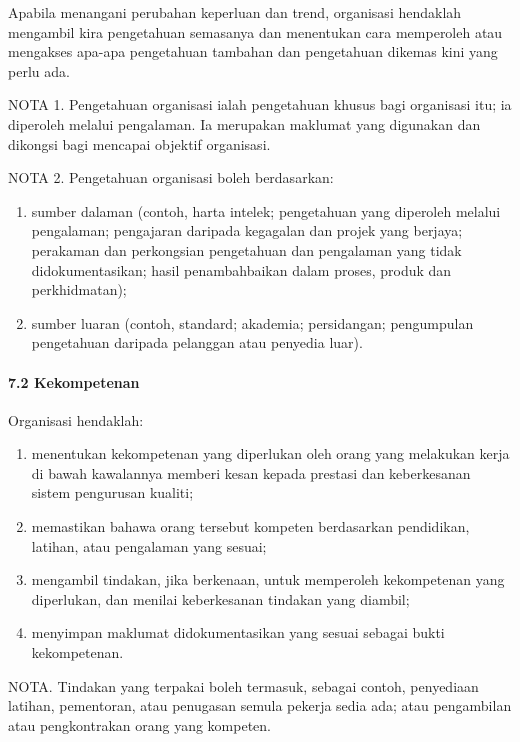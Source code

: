 \documentclass[
]{article}
\begin{document}
Apabila menangani perubahan keperluan dan trend, organisasi hendaklah
mengambil kira pengetahuan semasanya dan menentukan cara memperoleh atau
mengakses apa-apa pengetahuan tambahan dan pengetahuan dikemas kini yang
perlu ada.

NOTA 1. Pengetahuan organisasi ialah pengetahuan khusus bagi organisasi
itu; ia diperoleh melalui pengalaman. Ia merupakan maklumat yang
digunakan dan dikongsi bagi mencapai objektif organisasi.

NOTA 2. Pengetahuan organisasi boleh berdasarkan:

\begin{enumerate}
\def\labelenumi{\alph{enumi})}
\item
  sumber dalaman (contoh, harta intelek; pengetahuan yang diperoleh
  melalui pengalaman; pengajaran daripada kegagalan dan projek yang
  berjaya; perakaman dan perkongsian pengetahuan dan pengalaman yang
  tidak didokumentasikan; hasil penambahbaikan dalam proses, produk dan
  perkhidmatan);
\item
  sumber luaran (contoh, standard; akademia; persidangan; pengumpulan
  pengetahuan daripada pelanggan atau penyedia luar).
\end{enumerate}

\hypertarget{kekompetenan}{%
\paragraph{7.2 Kekompetenan}\label{kekompetenan}}

Organisasi hendaklah:

\begin{enumerate}
\def\labelenumi{\alph{enumi})}
\item
  menentukan kekompetenan yang diperlukan oleh orang yang melakukan
  kerja di bawah kawalannya memberi kesan kepada prestasi dan
  keberkesanan sistem pengurusan kualiti;
\item
  memastikan bahawa orang tersebut kompeten berdasarkan pendidikan,
  latihan, atau pengalaman yang sesuai;
\item
  mengambil tindakan, jika berkenaan, untuk memperoleh kekompetenan yang
  diperlukan, dan menilai keberkesanan tindakan yang diambil;
\item
  menyimpan maklumat didokumentasikan yang sesuai sebagai bukti
  kekompetenan.
\end{enumerate}

NOTA. Tindakan yang terpakai boleh termasuk, sebagai contoh, penyediaan
latihan, pementoran, atau penugasan semula pekerja sedia ada; atau
pengambilan atau pengkontrakan orang yang kompeten.
\end{document}
